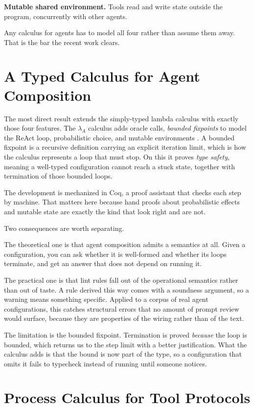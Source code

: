 \textbf{Mutable shared environment.} Tools read and write state outside the
program, concurrently with other agents.

Any calculus for agents has to model all four rather than assume them away.
That is the bar the recent work clears.

\section{A Typed Calculus for Agent Composition}

The most direct result extends the simply-typed lambda calculus with exactly
those four features. The $\lambda_A$ calculus adds oracle calls, \emph{bounded fixpoints} to model the ReAct loop, probabilistic choice, and mutable environments \cite{lambdaA2026}. A bounded fixpoint is a recursive definition carrying an explicit iteration limit, which is how the calculus represents a loop that must stop. On this it proves \emph{type safety}, meaning a well-typed configuration cannot reach a stuck state, together with termination of those bounded loops.

The development is mechanized in Coq, a proof assistant that checks each step by machine. That matters here because hand proofs about probabilistic effects and mutable state are exactly the kind that look right and are not.

Two consequences are worth separating.

The theoretical one is that agent composition admits a semantics at all. Given a
configuration, you can ask whether it is well-formed and whether its loops
terminate, and get an answer that does not depend on running it.

The practical one is that lint rules fall out of the operational semantics rather
than out of taste. A rule derived this way comes with a soundness argument, so a
warning means something specific. Applied to a corpus of real agent
configurations, this catches structural errors that no amount of prompt review
would surface, because they are properties of the wiring rather than of the text.

The limitation is the bounded fixpoint. Termination is proved \emph{because} the
loop is bounded, which returns us to the step limit with a better justification.
What the calculus adds is that the bound is now part of the type, so a
configuration that omits it fails to typecheck instead of running until someone
notices.

\section{Process Calculus for Tool Protocols}

